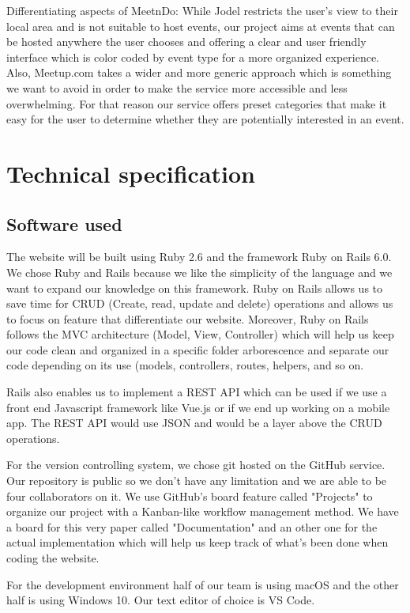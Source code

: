 \documentclass[conference]{IEEEtran}
\begin{document}
Differentiating aspects of MeetnDo: While Jodel restricts the user’s view to their local area and is not suitable to host events, our project aims at events that can be hosted anywhere the user chooses and offering a clear and user friendly interface which is color coded by event type for a more organized experience. Also, Meetup.com takes a wider and more generic approach which is something we want to avoid in order to make the service more accessible and less overwhelming. For that reason our service offers preset categories that make it easy for the user to determine whether they are potentially interested in an event.

\section{Technical specification}

\subsection{Software used}

The website will be built using Ruby 2.6 and the framework Ruby on Rails 6.0. We chose Ruby and Rails because we like the simplicity of the language and we want to expand our knowledge on this framework. Ruby on Rails allows us to save time for CRUD (Create, read, update and delete) operations and allows us to focus on feature that differentiate our website. Moreover, Ruby on Rails follows the MVC architecture (Model, View, Controller) which will help us keep our code clean and organized in a specific folder arborescence and separate our code depending on its use (models, controllers, routes, helpers, and so on.

Rails also enables us to implement a REST API which can be used if we use a front end Javascript framework like Vue.js or if we end up working on a mobile app. The REST API would use JSON and would be a layer above the CRUD operations.

For the version controlling system, we chose git hosted on the GitHub service. Our repository is public so we don't have any limitation and we are able to be four collaborators on it. We use GitHub's board feature called "Projects" to organize our project with a Kanban-like workflow management method. We have a board for this very paper called "Documentation" and an other one for the actual implementation which will help us keep track of what's been done when coding the website.

For the development environment half of our team is using macOS and the other half is using Windows 10. Our text editor of choice is VS Code.
\end{document}
